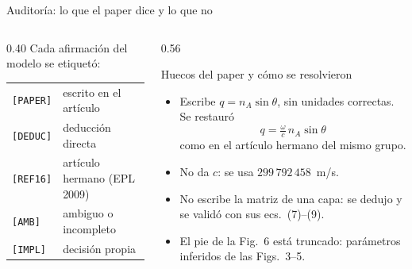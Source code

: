 \documentclass[aspectratio=169,10pt]{beamer}
\begin{document}
\begin{frame}{Auditoría: lo que el paper dice y lo que no}
  \begin{columns}[T]
    \begin{column}{0.40\textwidth}
      Cada afirmación del modelo se etiquetó:
      \vspace{0.3em}

      \small
      \begin{tabular}{@{}ll@{}}
        \toprule
        \texttt{[PAPER]} & escrito en el artículo \\
        \texttt{[DEDUC]} & deducción directa \\
        \texttt{[REF16]} & artículo hermano (EPL 2009) \\
        \texttt{[AMB]} & ambiguo o incompleto \\
        \texttt{[IMPL]} & decisión propia \\
        \bottomrule
      \end{tabular}
    \end{column}
    \begin{column}{0.56\textwidth}
      \begin{alertblock}{Huecos del paper y cómo se resolvieron}
        \small
        \begin{itemize}
          \item Escribe $q = n_A\sin\theta$, sin unidades correctas. Se restauró
            \[ q = \tfrac{\omega}{c}\,n_A\sin\theta \]
            como en el artículo hermano del mismo grupo.
          \item No da $c$: se usa $299\,792\,458$~m/s.
          \item No escribe la matriz de una capa: se dedujo y se validó con sus ecs.~(7)--(9).
          \item El pie de la Fig.~6 está truncado: parámetros inferidos de las Figs.~3--5.
        \end{itemize}
      \end{alertblock}
    \end{column}
  \end{columns}
\end{frame}
\end{document}
